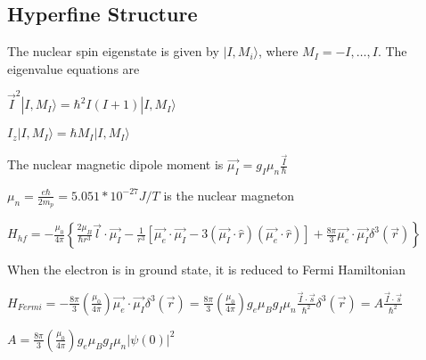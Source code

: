 \documentclass[12pt]{article}
\begin{document}
\begin{spacing}{2.0}
\section{Hyperfine Structure}

The nuclear spin eigenstate is given by $|I,M_i \rangle$, where $M_I = -I, \ldots, I$. The eigenvalue equations are

$\vec{I}^2 |I ,M_I \rangle = \hbar^2 I(I+1) |I,M_I \rangle$

$I_z |I ,M_I \rangle= \hbar M_I |I ,M_I \rangle$

The nuclear magnetic dipole moment is $\vec{\mu_I} = g_I \mu_n \frac{\vec{I}}{\hbar}$

$\mu_n = \frac{e\hbar}{2m_p}= 5.051 *10^{-27} J/T$ is the nuclear magneton

$H_{hf}= -\frac{\mu_0}{4\pi} \left\{ \frac{2\mu_B}{\hbar r^3} \vec{l} \cdot \vec{\mu_I} - \frac{1}{r^3} \left[ \vec{\mu_e} \cdot \vec{\mu_I} - 3(\vec{\mu_I} \cdot \hat{r})(\vec{\mu_e} \cdot \hat{r}) \right] + \frac{8\pi}{3} \vec{\mu_e} \cdot \vec{\mu_I} \delta^3(\vec{r}) \right\}$

When the electron is in ground state, it is reduced to Fermi Hamiltonian

$H_{Fermi}= -\frac{8\pi}{3} \left( \frac{\mu_0}{4\pi} \right) \vec{\mu_e} \cdot \vec{\mu_I} \delta^3(\vec{r})= \frac{8\pi}{3} \left( \frac{\mu_0}{4\pi} \right) g_e \mu_B g_I \mu_n \frac{\vec{I} \cdot \vec{s}}{\hbar^2} \delta^3(\vec{r})= A \frac{\vec{I} \cdot \vec{s}}{\hbar^2}$

$A=\frac{8\pi}{3} \left( \frac{\mu_0}{4\pi} \right) g_e \mu_B g_I \mu_n |\psi(0)|^2$

\end{spacing}
\end{document}
